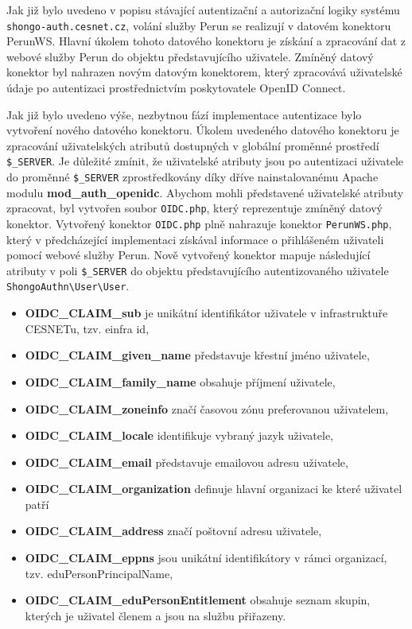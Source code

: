 \documentclass[
  printed, %
  twoside, %
  table,   %
  nolof,     %
  nolot,     %
]{fithesis3}
\begin{document}
Jak již bylo uvedeno v popisu stávající autentizační a autorizační logiky systému \texttt{shongo-auth.cesnet.cz}, volání služby Perun se realizují v datovém konektoru PerunWS. Hlavní úkolem tohoto datového konektoru je získání a zpracování dat z webové služby Perun do objektu představujícího uživatele. Zmíněný datový konektor byl nahrazen novým datovým konektorem, který zpracovává uživatelské údaje po autentizaci prostřednictvím poskytovatele OpenID Connect. 
\par

Jak již bylo uvedeno výše, nezbytnou fází implementace autentizace bylo vytvoření nového datového konektoru. Úkolem uvedeného datového konektoru je zpracování uživatelských atributů dostupných v globální proměnné prostředí \texttt{\$\_SERVER}. Je důležité zmínit, že uživatelské atributy jsou po autentizaci uživatele do proměnné \texttt{\$\_SERVER} zprostředkovány díky dříve nainstalovanému Apache modulu \textbf{mod\_auth\_openidc}. Abychom mohli představené uživatelské atributy zpracovat, byl vytvořen soubor \texttt{OIDC.php}, který reprezentuje zmíněný datový konektor. Vytvořený konektor \texttt{OIDC.php} plně nahrazuje konektor \texttt{PerunWS.php}, který v předcházející implementaci získával informace o přihlášeném uživateli pomocí webové služby Perun. Nově vytvořený konektor mapuje následující atributy v poli \texttt{\$\_SERVER} do objektu představujícího autentizovaného uživatele \texttt{ShongoAuthn\textbackslash User\textbackslash User}. 

\begin{itemize}
    \item \textbf{OIDC\_CLAIM\_sub} je unikátní identifikátor uživatele v infrastruktuře CESNETu, tzv. einfra id,
    \item \textbf{OIDC\_CLAIM\_given\_name} představuje křestní jméno uživatele,
    \item \textbf{OIDC\_CLAIM\_family\_name} obsahuje příjmení uživatele,
    \item \textbf{OIDC\_CLAIM\_zoneinfo} značí časovou zónu preferovanou uživatelem, 
    \item \textbf{OIDC\_CLAIM\_locale} identifikuje vybraný jazyk uživatele,
    \item \textbf{OIDC\_CLAIM\_email} představuje emailovou adresu uživatele,
    \item \textbf{OIDC\_CLAIM\_organization} definuje hlavní organizaci ke které uživatel patří
    \item \textbf{OIDC\_CLAIM\_address} značí poštovní adresu uživatele,
    \item \textbf{OIDC\_CLAIM\_eppns} jsou unikátní identifikátory v rámci organizací, tzv. eduPersonPrincipalName, 
    \item \textbf{OIDC\_CLAIM\_eduPersonEntitlement} obsahuje seznam skupin, kterých je uživatel členem a jsou na službu přiřazeny. 
\end{itemize}
\end{document}
